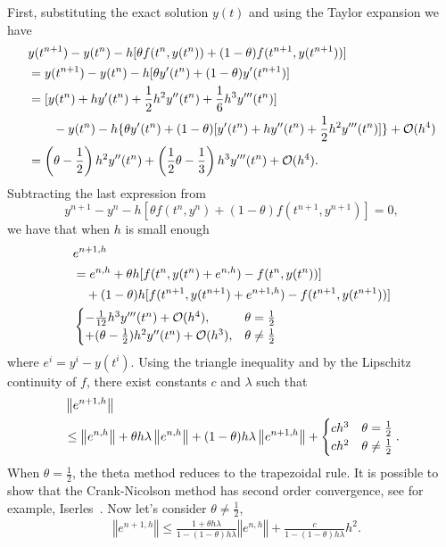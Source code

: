 First, substituting the exact solution $y(t)$ and using the Taylor expansion we have
\begin{align}
&{}y(t^{n+1})-y(t^{n})-h[\theta f(t^{n},y(t^{n}))+(1-\theta)f(t^{n+1},y(t^{n+1}))]
\\&{}=y(t^{n+1})-y(t^{n})-h[\theta y'(t^{n})+(1-\theta)y'(t^{n+1})] \notag
\\&{} =[y(t^{n})+hy'(t^{n})+\frac{1}{2}h^{2}y''(t^{n})+\frac{1}{6}h^{3}y^{\prime\prime\prime}(t^{n})] \notag
\\&{}\hspace{2em}-y(t^{n})-h\{\theta y'(t^{n})+(1-\theta)[y'(t^{n})+hy''(t^{n})+\frac{1}{2}h^{2}y^{\prime\prime\prime}(t^{n})]\}+\mathcal{O}(h^{4}) \notag
\\&{}=\left(\theta-\frac{1}{2}\right)h^{2}y''(t^{n})+\left(\frac{1}{2}\theta-\frac{1}{3}\right)h^{3}y^{\prime\prime\prime}(t^{n})+\mathcal{O}(h^{4}). \notag
\end{align}
Subtracting the last expression from 
\begin{equation}
y^{n+1}-y^{n}-h[\theta f(t^{n},y^{n})+(1-\theta)f(t^{n+1},y^{n+1})]=0,
\end{equation}
we have that when $h$ is small enough
\begin{align}
&{}e^{n+1,h}
\\&{}=e^{n,h}+\theta h[f(t^{n},y(t^{n})+e^{n,h})-f(t^{n},y(t^{n}))] \notag
\\&{}\hspace{1em}+(1-\theta)h[f(t^{n+1},y(t^{n+1})+e^{n+1,h})-f(t^{n+1},y(t^{n+1}))] \notag
\\&{} \begin{cases}
-\frac{1}{12}h^{3}y^{\prime\prime\prime}(t^{n})+\mathcal{O}(h^{4}), & \theta=\frac{1}{2}\\
+(\theta-\frac{1}{2})h^{2}y''(t^{n})+\mathcal{O}(h^{3}), & \theta\neq\frac{1}{2}
\end{cases} \notag
\end{align} 
where $e^{i}=y^{i}-y(t^{i})$. Using the triangle inequality and by the Lipschitz continuity of $f$, there exist constants $c$ and $\lambda$ such that 
\begin{align}
&{}\left\Vert e^{n+1,h}\right\Vert
\\&{} \leq\left\Vert e^{n,h}\right\Vert +\theta h\lambda\left\Vert e^{n,h}\right\Vert +(1-\theta)h\lambda\left\Vert e^{n+1,h}\right\Vert +\begin{cases}
ch^{3} & \theta=\frac{1}{2}\\
ch^{2} & \theta\neq\frac{1}{2}
\end{cases}. \notag
\end{align}
When $\theta=\frac{1}{2}$, the theta method reduces to the trapezoidal rule. It is possible to show that the Crank-Nicolson method has second order convergence, see for example, Iserles~\cite{Ise09}. Now let's consider $\theta\neq\frac{1}{2}$, 
\begin{align}
&{}\left\Vert e^{n+1,h}\right\Vert \leq\frac{1+\theta h\lambda}{1-(1-\theta)h\lambda}\left\Vert e^{n,h}\right\Vert +\frac{c}{1-(1-\theta)h\lambda}h^{2}. 
\end{align}

